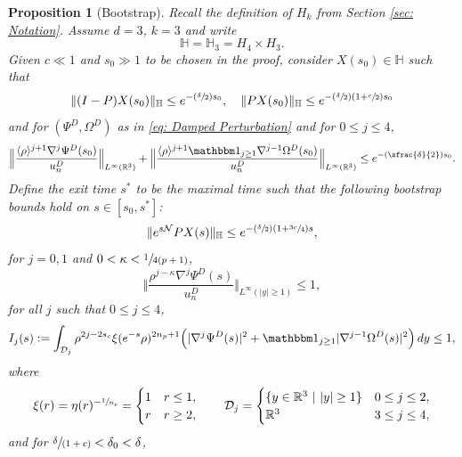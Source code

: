 \documentclass[JEP,XML,SOM,Unicode]{cedram}
\newcommand{\Psfrac}[2]{(\sfrac{#1}{#2})}
\newcommand{\spfrac}[2]{\sfrac{#1}{(#2)}}
\theoremstyle{plain}
\newtheorem{proposition}{Proposition}[section]
\theoremstyle{definition}
\begin{document}
\begin{proposition}[Bootstrap]
\label{prop: Bootstrap}
Recall the definition of $H_k$ from Section \ref{sec: Notation}. Assume $d=3$, $k=3$ and write
\[
\mathbb H=\mathbb H_3= H_4\times H_3.
\]
Given $c\ll 1$ and $s_0\gg1$ to be chosen in the proof, consider $X(s_0)\in \mathbb H$ such that
\begin{equation}
\label{eq: Choice of Initial Value 1}
\Vert (I-P)X(s_0)\Vert_{\mathbb H}\le e^{-\Psfrac{\delta}{2}s_0}, \quad \Vert PX(s_0)\Vert_{\mathbb H}\le e^{-\Psfrac{\delta}{2}(1+\sfrac{c}{2})s_0}
\end{equation}
and for $(\Psi^D,\Omega^D)$ as in \eqref{eq: Damped Perturbation} and for $0\le j\le 4$,
\begin{equation}
\label{eq: Choice of Initial Value 2}
\Big\Vert \frac{\langle\rho\rangle^{j+1}\nabla ^j\Psi^D(s_0)}{u_n^D}\Big\Vert_{L^\infty(\mathbb R^3)}+\Big\Vert \frac{\langle\rho\rangle^{j+1}\mathbbm 1_{j\ge1}\nabla ^{j-1}\Omega^D(s_0)}{u_n^D}\Big\Vert_{L^\infty(\mathbb R^3)}\le e^{- \Psfrac{\delta}{2}s_0}.
\end{equation}
Define the exit time $s^*$ to be the maximal time such that the following bootstrap bounds hold on $s\in [s_0,s^*]$:
\begin{equation}
\label{eq: Bootstrap Bound 1}
\Vert e^{s\mathcal N}PX(s)\Vert_{\mathbb H}\le e^{-\Psfrac{\delta}{2}(1+\sfrac{3c}{4})s},
\end{equation}
for $j=0, 1$ and $0<\kappa<\sfrac{1}{4(p+1)}$,
\begin{equation}
\label{eq: Bootstrap Bound 2}
\Big\Vert \frac{\rho^{j-\kappa}\nabla ^j\Psi^D(s)}{u_n^D}\Big\Vert_{L^\infty(|y|\ge1)}\le 1,
\end{equation}
for all $j$ such that $0\le j \le 4$,
\begin{equation}
\label{eq: Bootstrap Bound 3}
I_j(s):=\int_{\mathcal D_j} \rho^{2j-2s_c}\xi(e^{-s}\rho)^{2n_p+1}\Big(|\nabla^j\Psi^D(s)|^2+\mathbbm 1_{j\ge1}|\nabla^{j-1}\Omega^D(s)|^2\Big)\,dy\le1,
\end{equation}
where
\[
\xi(r)=\eta(r)^{-\sfrac{1}{n_p}}=\begin{cases}
1 & r\le1, \\
r & r\ge 2,
\end{cases}\qquad \mathcal D_j=\begin{cases}
\{y\in \mathbb R^3\ |\ |y|\ge1\} & 0\le j\le 2, \\
\mathbb R^3 & 3\le j\le 4,
\end{cases}
\]
and for $\spfrac{\delta}{1+c}<\delta_0<\delta$,

\end{proposition}
\end{document}
